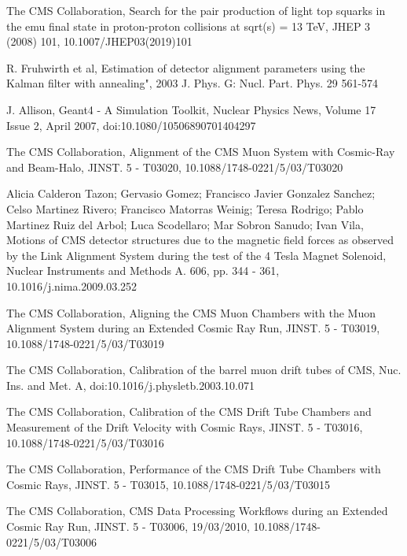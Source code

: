 \begin{thebibliography}{20}
  {The CMS Collaboration, Search for the pair production of light top squarks in the emu final state in proton-proton collisions at sqrt(s) = 13 TeV, JHEP 3 (2008) 101, 10.1007/JHEP03(2019)101}
  
  {}
 
  
  {R. Fruhwirth et al, Estimation of detector alignment parameters using the Kalman filter with annealing", 2003 J. Phys. G: Nucl. Part. Phys. 29 561-574}  
  
  {J. Allison, Geant4 - A Simulation Toolkit, Nuclear Physics News, Volume 17 Issue 2, April 2007, doi:10.1080/10506890701404297} 
  
  {The CMS Collaboration, Alignment of the CMS Muon System with Cosmic-Ray and Beam-Halo, JINST. 5 - T03020, 10.1088/1748-0221/5/03/T03020}
  
  {Alicia Calderon Tazon; Gervasio Gomez; Francisco Javier Gonzalez Sanchez; Celso Martinez Rivero; Francisco Matorras Weinig; Teresa Rodrigo; Pablo Martinez Ruiz del Arbol; Luca Scodellaro; Mar Sobron Sanudo; Ivan Vila, Motions of CMS detector structures due to the magnetic field forces as observed by the Link Alignment System during the test of the 4 Tesla Magnet Solenoid, Nuclear Instruments and Methods A. 606, pp. 344 - 361, 10.1016/j.nima.2009.03.252}

  {The CMS Collaboration, Aligning the CMS Muon Chambers with the Muon Alignment System during an Extended Cosmic Ray Run, JINST. 5 - T03019, 10.1088/1748-0221/5/03/T03019}

  {The CMS Collaboration, Calibration of the barrel muon drift tubes of CMS, Nuc. Ins. and Met. A,
  doi:10.1016/j.physletb.2003.10.071}
  
  {The CMS Collaboration, Calibration of the CMS Drift Tube Chambers and Measurement of the Drift Velocity with Cosmic Rays, JINST. 5 - T03016, 10.1088/1748-0221/5/03/T03016}

  {The CMS Collaboration, Performance of the CMS Drift Tube Chambers with Cosmic Rays, JINST. 5 - T03015, 10.1088/1748-0221/5/03/T03015}

  {The CMS Collaboration, CMS Data Processing Workflows during an Extended Cosmic Ray Run, JINST. 5 - T03006, 19/03/2010, 10.1088/1748-0221/5/03/T03006}
  

\end{thebibliography}
